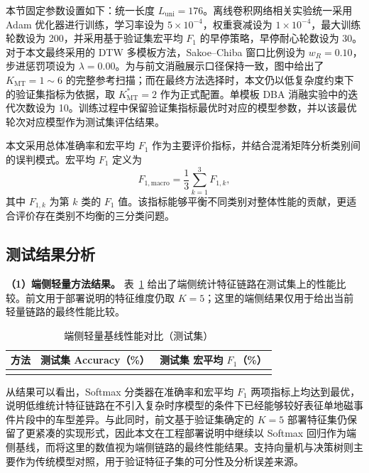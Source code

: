 本节固定参数设置如下：统一长度 $L_{\mathrm{uni}}=176$。离线卷积网络相关实验统一采用 Adam 优化器进行训练，学习率设为 $5\times10^{-4}$，权重衰减设为 $1\times10^{-4}$，最大训练轮数设为 200，并采用基于验证集宏平均 $F_1$ 的早停策略，早停耐心轮数设为 30。对于本文最终采用的 DTW 多模板方法，Sakoe--Chiba 窗口比例设为 $w_R=0.10$，步进惩罚项设为 $\lambda=0.00$。为与前文消融展示口径保持一致，图中给出了 $K_{\mathrm{MT}}=1\sim 6$ 的完整参考扫描；而在最终方法选择时，本文仍以低复杂度约束下的验证集指标为依据，取 $K_{\mathrm{MT}}^\ast=2$ 作为正式配置。单模板 DBA 消融实验中的迭代次数设为 10。训练过程中保留验证集指标最优时对应的模型参数，并以该最优轮次对应模型作为测试集评估结果。

本文采用总体准确率和宏平均 $F_1$ 作为主要评价指标，并结合混淆矩阵分析类别间的误判模式。宏平均 $F_1$ 定义为
\begin{equation}
    F_{1,\mathrm{macro}}=\frac{1}{3}\sum_{k=1}^{3}F_{1,k},
\end{equation}
其中 $F_{1,k}$ 为第 $k$ 类的 $F_1$ 值。该指标能够平衡不同类别对整体性能的贡献，更适合评价存在类别不均衡的三分类问题。

\subsection{测试结果分析}
\label{subsec:ch3_exp_result}

\textbf{（1）端侧轻量方法结果。}
表~\ref{tab:ch3_edge} 给出了端侧统计特征链路在测试集上的性能比较。前文用于部署说明的特征维度仍取 $K=5$；这里的端侧结果仅用于给出当前轻量链路的最终性能比较。

\begin{table}[!htbp]
\centering
\small
\caption{端侧轻量基线性能对比（测试集）}
\label{tab:ch3_edge}
\begin{tabular}{lcc}
\hline
方法 & 测试集 Accuracy（\%） & 测试集 宏平均 $F_1$（\%） \\
\hline
\\
\hline
\end{tabular}
\end{table}

从结果可以看出，Softmax 分类器在准确率和宏平均 $F_1$ 两项指标上均达到最优，说明低维统计特征链路在不引入复杂时序模型的条件下已经能够较好表征单地磁事件片段中的车型差异。与此同时，前文基于验证集确定的 $K=5$ 部署特征集仍保留了更紧凑的实现形式，因此本文在工程部署说明中继续以 Softmax 回归作为端侧基线，而将这里的数值视为端侧链路的最终性能结果。支持向量机与决策树则主要作为传统模型对照，用于验证特征子集的可分性及分析误差来源。

